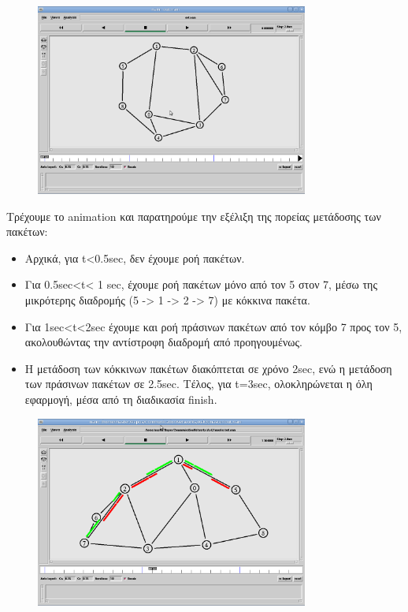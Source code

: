 \documentclass[a4paper,9pt]{article}
\begin{document}
\def\thesection {\Roman{section}.}



\section{}

\begin{figure}[H]
    \centering
    \includegraphics[width=0.8\textwidth]{files/1.png}
\end{figure}

Τρέχουμε το animation και παρατηρούμε την εξέλιξη της πορείας μετάδοσης των
πακέτων:

\begin{itemize}
    \item Αρχικά, για t<0.5sec, δεν έχουμε ροή πακέτων.
    \item Για 0.5sec<t< 1 sec, έχουμε ροή πακέτων μόνο από τον 5 στον 7, μέσω
        της μικρότερης διαδρομής (5 -> 1 -> 2 -> 7) με κόκκινα πακέτα.
    \item Για 1sec<t<2sec έχουμε και ροή πράσινων πακέτων από τον κόμβο 7 προς τον
        5, ακολουθώντας την αντίστροφη διαδρομή από προηγουμένως.
    \item Η μετάδοση των κόκκινων πακέτων διακόπτεται σε χρόνο 2sec, ενώ η
        μετάδοση των πράσινων πακέτων σε 2.5sec. Τέλος, για t=3sec, ολοκληρώνεται η
        όλη εφαρμογή, μέσα από τη διαδικασία finish.
\end{itemize}

\begin{figure}[H]
    \centering
    \includegraphics[width=0.8\textwidth]{files/2.png}
\end{figure}
\end{document}
